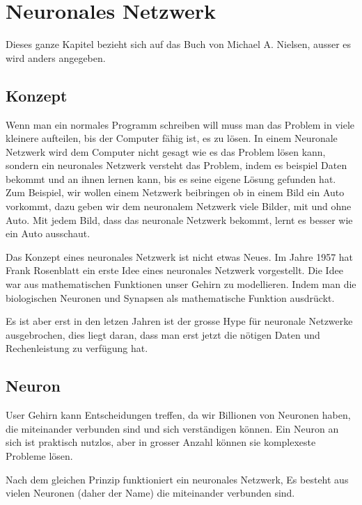 \documentclass[12pt,a4paper]{report}
\begin{document}
\chapter{Neuronales Netzwerk}
\label{ch:neuronalesNetzwerk}
Dieses ganze Kapitel bezieht sich auf das Buch von Michael A. Nielsen\cite{neuralbook}, ausser es wird anders angegeben.
\section{Konzept}\label{sec:konzept}
Wenn man ein normales Programm schreiben will muss man das Problem in viele kleinere aufteilen, bis der Computer fähig ist,
es zu lösen.
In einem Neuronale Netzwerk wird dem Computer nicht gesagt wie es das Problem lösen kann, sondern ein neuronales Netzwerk
versteht das Problem, indem es beispiel Daten bekommt und an ihnen lernen kann, bis es seine eigene Lösung gefunden hat.
Zum Beispiel, wir wollen einem Netzwerk beibringen ob in einem Bild ein Auto vorkommt,
dazu geben wir dem neuronalem Netzwerk viele Bilder, mit und ohne Auto.
Mit jedem Bild, dass das neuronale Netzwerk bekommt, lernt es besser wie ein Auto ausschaut.

Das Konzept eines neuronales Netzwerk ist nicht etwas Neues.
Im Jahre 1957 hat Frank Rosenblatt ein erste Idee eines neuronales Netzwerk vorgestellt.
Die Idee war aus mathematischen Funktionen unser Gehirn zu modellieren.
Indem man die biologischen Neuronen und Synapsen als mathematische Funktion ausdrückt.

Es ist aber erst in den letzen Jahren ist der grosse Hype für neuronale Netzwerke ausgebrochen,
dies liegt daran, dass man erst jetzt die nötigen Daten
und Rechenleistung zu verfügung hat.

\section{Neuron}\label{sec:neuron}
User Gehirn kann Entscheidungen treffen, da wir Billionen von Neuronen haben, die miteinander verbunden sind und sich
verständigen können.
Ein Neuron an sich ist praktisch nutzlos, aber in grosser Anzahl können sie komplexeste Probleme lösen.

Nach dem gleichen Prinzip funktioniert ein neuronales Netzwerk,
Es besteht aus vielen Neuronen (daher der Name) die miteinander verbunden sind.
\end{document}
